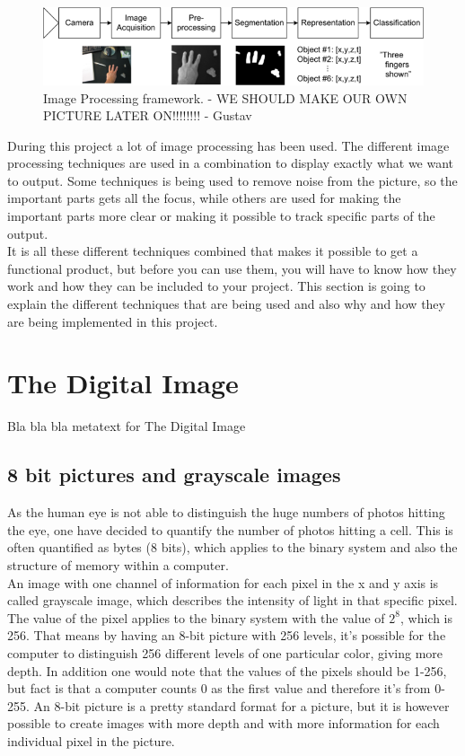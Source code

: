 \begin{figure}[htbp]
\centering
\includegraphics[width=1.00\textwidth]{Pictures/Theory/imageProcessing_steps.png}
\caption{Image Processing framework. - WE SHOULD MAKE OUR OWN PICTURE LATER ON!!!!!!!! - Gustav}
\label{fig:ip_framework}
\end{figure}

During this project a lot of image processing has been used. The different image processing techniques are used in a combination to display exactly what we want to output. Some techniques is being used to remove noise from the picture, so the important parts gets all the focus, while others are used for making the important parts more clear or making it possible to track specific parts of the output. \\
It is all these different techniques combined that makes it possible to get a functional product, but before you can use them, you will have to know how they work and how they can be included to your project. This section is going to explain the different techniques that are being used and also why and how they are being implemented in this project.

\section{The Digital Image}
Bla bla bla metatext for The Digital Image

\subsection{8 bit pictures and grayscale images}
As the human eye is not able to distinguish the huge numbers of photos hitting the eye, one have decided to quantify the number of photos hitting a cell. This is often quantified as bytes (8 bits), which applies to the binary system and also the structure of memory within a computer.\\
An image with one channel of information for each pixel in the x and y axis is called grayscale image, which describes the intensity of light in that specific pixel. The value of the pixel applies to the binary system with the value of $2^8$, which is 256. That means by having an 8-bit picture with 256 levels, it's possible for the computer to distinguish 256 different levels of one particular color, giving more depth. In addition one would note that the values of the pixels should be 1-256, but fact is that a computer counts 0 as the first value and therefore it's from 0-255. An 8-bit picture is a pretty standard format for a picture, but it is however possible to create images with more depth and with more information for each individual pixel in the picture.\\

